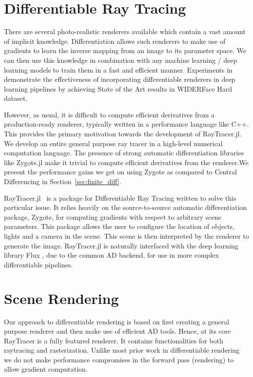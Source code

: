 \documentclass{juliacon}
\begin{document}
\section{Differentiable Ray Tracing}

There are several photo-realistic renderers available which contain a vast amount of implicit knowledge. Differentiation allows such renderers to make use of gradients to learn the inverse mapping from an image to its parameter space. We can then use this knowledge in combination with any machine learning / deep learning models to train them in a fast and efficient manner. Experiments in~\cite{retinaface} demonstrate the effectiveness of incorporating differentiable renderers in deep learning pipelines by achieving State of the Art results in WIDERFace Hard dataset.

However, as usual, it is difficult to compute efficient derivatives from a production-ready renderer, typically written in a performance language like C++. This provides the primary motivation towards the development of RayTracer.jl. We develop an entire general purpose ray tracer in a high-level numerical computation language. The presence of strong automatic differentiation libraries like Zygote.jl make it trivial to compute efficient derivatives from the renderer.We present the performance gains we get on using Zygote as compared to Central Differencing in Section~\ref{sec:finite_diff}.


RayTracer.jl~\cite{RayTracer.jl} is a package for Differentiable Ray Tracing written to solve this particular issue. It relies heavily on the source-to-source automatic differentiation package, Zygote, for computing gradients with respect to arbitrary scene parameters. This package allows the user to configure the location of objects, lights and a camera in the scene. This scene is then interpreted by the renderer to generate the image. RayTracer.jl is naturally interfaced with the deep learning library Flux \cite{Flux.jl-2018}, due to the common AD backend, for use in more complex differentiable pipelines.

\section{Scene Rendering}

Our approach to differentiable rendering is based on first creating a general purpose renderer and then make use of efficient AD tools. Hence, at its core RayTracer is a fully featured renderer. It contains functionalities for both raytracing and rasterization. Unlike most prior work in differentiable rendering we do not make performance compromises in the forward pass (rendering) to allow gradient computation.
\end{document}
